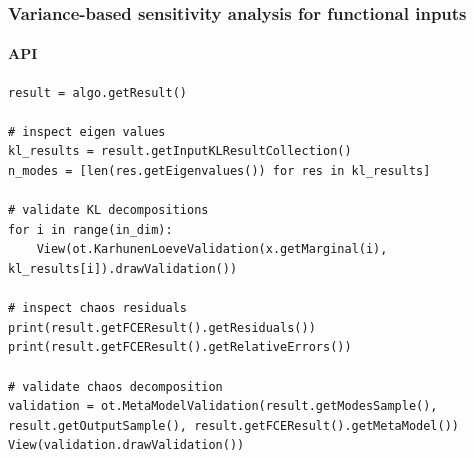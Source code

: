 \documentclass[aspectratio=169]{beamer}
\begin{document}
\begin{frame}[containsverbatim]
\frametitle{Variance-based sensitivity analysis for functional inputs}

\framesubtitle{API}

\lstset{language=python}
\begin{lstlisting}
result = algo.getResult()

# inspect eigen values
kl_results = result.getInputKLResultCollection()
n_modes = [len(res.getEigenvalues()) for res in kl_results]

# validate KL decompositions
for i in range(in_dim):
    View(ot.KarhunenLoeveValidation(x.getMarginal(i), kl_results[i]).drawValidation())

# inspect chaos residuals
print(result.getFCEResult().getResiduals())
print(result.getFCEResult().getRelativeErrors())

# validate chaos decomposition
validation = ot.MetaModelValidation(result.getModesSample(), result.getOutputSample(), result.getFCEResult().getMetaModel())
View(validation.drawValidation())

\end{lstlisting}

\end{frame}
\end{document}
